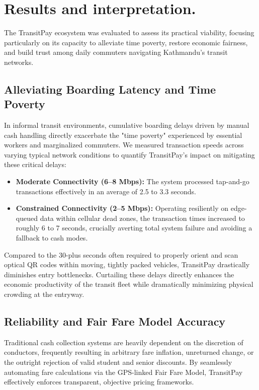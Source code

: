 \documentclass[manuscript,review,anonymous]{acmart}
\begin{document}
\section{Results and interpretation.}
The TransitPay ecosystem was evaluated to assess its practical viability, focusing particularly on its capacity to alleviate time poverty, restore economic fairness, and build trust among daily commuters navigating Kathmandu's transit networks.

\subsection{Alleviating Boarding Latency and Time Poverty}
In informal transit environments, cumulative boarding delays driven by manual cash handling directly exacerbate the "time poverty" experienced by essential workers and marginalized commuters. We measured transaction speeds across varying typical network conditions to quantify TransitPay's impact on mitigating these critical delays:

\begin{itemize}
    \item \textbf{Moderate Connectivity (6--8 Mbps):} The system processed tap-and-go transactions effectively in an average of 2.5 to 3.3 seconds.
    \item \textbf{Constrained Connectivity (2--5 Mbps):} Operating resiliently on edge-queued data within cellular dead zones, the transaction times increased to roughly 6 to 7 seconds, crucially averting total system failure and avoiding a fallback to cash modes.
\end{itemize}

Compared to the 30-plus seconds often required to properly orient and scan optical QR codes within moving, tightly packed vehicles, TransitPay drastically diminishes entry bottlenecks. Curtailing these delays directly enhances the economic productivity of the transit fleet while dramatically minimizing physical crowding at the entryway.

\subsection{Reliability and Fair Fare Model Accuracy}

Traditional cash collection systems are heavily dependent on the discretion of conductors, frequently resulting in arbitrary fare inflation, unreturned change, or the outright rejection of valid student and senior discounts. By seamlessly automating fare calculations via the GPS-linked Fair Fare Model, TransitPay effectively enforces transparent, objective pricing frameworks. 
\end{document}

